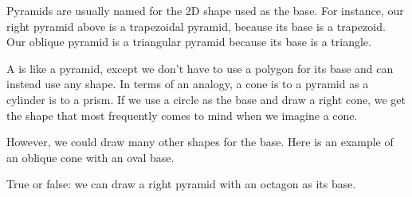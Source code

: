 \documentclass{ximera}
\begin{document}
Pyramids are usually named for the 2D shape used as the base. For instance, our right pyramid above is a trapezoidal pyramid, because its base is a trapezoid. Our oblique pyramid is a triangular pyramid because its base is a triangle.

A  is like a pyramid, except we don't have to use a polygon for its base and can instead use any shape. In terms of an analogy, a cone is to a pyramid as a cylinder is to a prism. If we use a circle as the base and draw a right cone, we get the shape that most frequently comes to mind when we imagine a cone.
\begin{image}
\end{image}


However, we could draw many other shapes for the base. Here is an example of an oblique cone with an oval base.
\begin{image}
\end{image}

\begin{question}
True or false: we can draw a right pyramid with an octagon as its base.
\begin{multipleChoice}
\end{multipleChoice}
\end{question}
\end{document}
